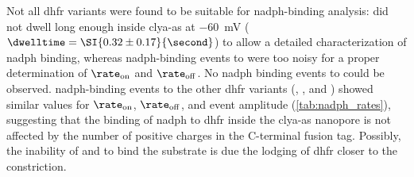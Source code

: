 Not all \gls{dhfr} variants were found to be suitable for \gls{nadph}-binding analysis:  did not
dwell long enough inside \gls{clya-as} at \SI{-60}{\mV} ($\dwelltime = \SI{0.32\pm0.17}{\second}$) to allow a
detailed characterization of \gls{nadph} binding, whereas \gls{nadph}-binding events to  were too
noisy for a proper determination of $\rate_{\rm{on}}$ and $\rate_{\rm{off}}$. No \gls{nadph} binding events to
 could be observed.  \gls{nadph}-binding events to the other \gls{dhfr} variants (,
, and ) showed similar values for $\rate_{\rm{on}}$, $\rate_{\rm{off}}$, and event
amplitude (\cref{tab:nadph_rates}), suggesting that the binding of \gls{nadph} to \gls{dhfr} inside the
\gls{clya-as} nanopore is not affected by the number of positive charges in the C-terminal fusion tag.
Possibly, the inability of  and  to bind the substrate is due the lodging of
\gls{dhfr} closer to the \transi{} constriction.


